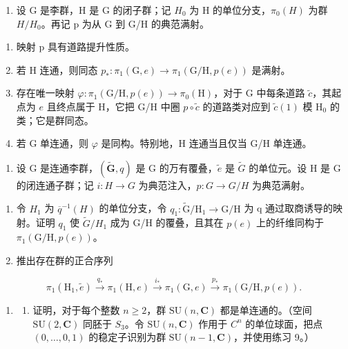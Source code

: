 \begin{enumerate}
\def\labelenumi{\arabic{enumi})}
\setcounter{enumi}{7}
\tightlist
\item
  设 G 是李群，H 是 G 的闭子群；记 \(H_{0}\) 为 H 的单位分支，\(\pi_{0}(H)\) 为群 \(H/H_{0}\)。再记 p 为从 G 到 G/H 的典范满射。
\end{enumerate}

\begin{enumerate}
\def\labelenumi{\alph{enumi})}
\item
  映射 p 具有道路提升性质。
\item
  若 H 连通，则同态 \(p_{*}\colon\pi_{1}(\mathrm{G},e)\to\pi_{1}(\mathrm{G}/\mathrm{H},p(e))\) 是满射。
\item
  存在唯一映射 \(\varphi\colon\pi_{1}(\mathrm{G/H},p(e))\to\pi_{0}(\mathrm{H})\)，对于 G 中每条道路 \(\widetilde{c}\)，其起点为 \(e\) 且终点属于 H，它把 G/H 中圈 \(p\circ\widetilde{c}\) 的道路类对应到 \(\widetilde{c}(1)\) 模 \(\mathrm{H}_{0}\) 的类；它是群同态。
\item
  若 G 单连通，则 \(\varphi\) 是同构。特别地，H 连通当且仅当 G/H 单连通。
\end{enumerate}

\begin{enumerate}
\def\labelenumi{\arabic{enumi})}
\setcounter{enumi}{8}
\tightlist
\item
  设 G 是连通李群，\((\widetilde{\mathbf{G}}, q)\) 是 G 的万有覆叠，\(\widetilde{e}\) 是 \(\widetilde{G}\) 的单位元。设 H 是 G 的闭连通子群；记 \(i: H \to G\) 为典范注入，\(p: G \to G/H\) 为典范满射。
\end{enumerate}

\begin{enumerate}
\def\labelenumi{\alph{enumi})}
\item
  令 \(H_{1}\) 为 \(\overline{q}^{-1}(H)\) 的单位分支，令 \(q_{1}\colon\widetilde{\mathrm{G}}/\mathrm{H}_{1}\to\mathrm{G}/\mathrm{H}\) 为 q 通过取商诱导的映射。证明 \(q_{1}\) 使 \(\widetilde{G}/H_{1}\) 成为 G/H 的覆叠，且其在 \(p(e)\) 上的纤维同构于 \(\pi_{1}(\mathrm{G}/\mathrm{H},p(e))\)。
\item
  推出存在群的正合序列
\end{enumerate}

\[
\pi_ {1} (\mathrm{H} _ {1}, \widetilde {e}) \xrightarrow {q _ {*}} \pi_ {1} (\mathrm{H}, e) \xrightarrow {i _ {*}} \pi_ {1} (\mathrm{G}, e) \xrightarrow {p _ {*}} \pi_ {1} (\mathrm{G} / \mathrm{H}, p (e)).
\]

\begin{enumerate}
\def\labelenumi{\arabic{enumi})}
\setcounter{enumi}{9}
\tightlist
\item
  \begin{enumerate}
  \def\labelenumii{\alph{enumii})}
  \tightlist
  \item
    证明，对于每个整数 \(n \geqslant 2\)，群 \(\mathrm{SU}(n, \mathbf{C})\) 都是单连通的。（空间 \(\mathrm{SU}(2, \mathbf{C})\) 同胚于 \(S_{3}\)。令 \(\mathrm{SU}(n, \mathbf{C})\) 作用于 \(C^{n}\) 的单位球面，把点 \((0, \ldots, 0, 1)\) 的稳定子识别为群 \(\mathrm{SU}(n - 1, \mathbf{C})\)，并使用练习 9。）
  \end{enumerate}
\end{enumerate}

